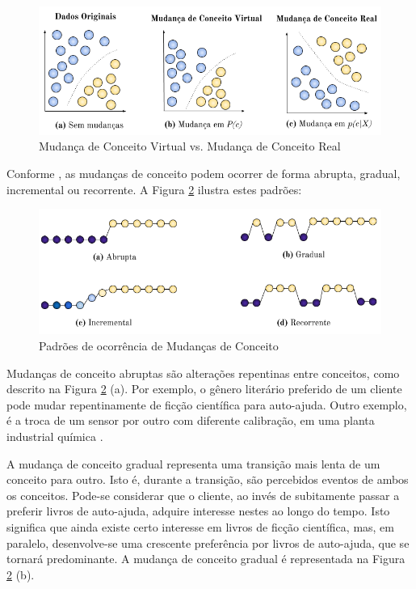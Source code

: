 \documentclass[qual, classic, a4paper]{ufbathesis}
\begin{document}
\begin{figure}[H]
\begin{center}
    \includegraphics[scale=0.8]{imagens/concept_drift.png}
    \caption{Mudança de Conceito Virtual vs. Mudança de Conceito Real}
    \label{fig:real_and_virtual_concept_drift}
\end{center}
\end{figure}

Conforme \cite{Gama:2014:SCD:2597757.2523813}, as mudanças de conceito podem ocorrer de forma abrupta, gradual, incremental ou recorrente.
A Figura \ref{fig:concept_drift_patterns} ilustra estes padrões:

\begin{figure}[H]
\begin{center}
    \includegraphics[scale=0.8]{imagens/concept_drift_patterns.png}
    \caption{Padrões de ocorrência de Mudanças de Conceito}
    \label{fig:concept_drift_patterns}
\end{center}
\end{figure}

Mudanças de conceito abruptas são alterações repentinas entre conceitos, como descrito na Figura \ref{fig:concept_drift_patterns} (a).
Por exemplo, o gênero literário preferido de um cliente pode mudar repentinamente de ficção científica para auto-ajuda.
Outro exemplo, é a troca de um sensor por outro com diferente calibração, em uma planta industrial química \cite{Gama:2014:SCD:2597757.2523813}. 

A mudança de conceito gradual representa uma transição mais lenta de um conceito para outro.
Isto é, durante a transição, são percebidos eventos de ambos os conceitos.
Pode-se considerar que o cliente, ao invés de subitamente passar a preferir livros de auto-ajuda, adquire interesse nestes ao longo do tempo.
Isto significa que ainda existe certo interesse em livros de ficção científica, mas, em paralelo, desenvolve-se uma crescente preferência por livros de auto-ajuda, que se tornará predominante.
A mudança de conceito gradual é representada na Figura \ref{fig:concept_drift_patterns} (b).
\end{document}
